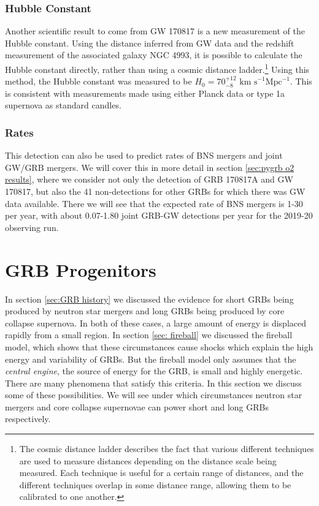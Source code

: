 \documentclass[11pt]{cuthesis}
\begin{document}
\subsubsection{Hubble Constant}
Another scientific result to come from GW 170817 is a new measurement of the Hubble constant. Using the distance inferred from GW data and the redshift measurement of the associated galaxy NGC 4993, it is possible to calculate the Hubble constant directly, rather than using a cosmic distance ladder.\footnote{The cosmic distance ladder describes the fact that various different techniques are used to measure distances depending on the distance scale being measured. Each technique is useful for a certain range of distances, and the different techniques overlap in some distance range, allowing them to be calibrated to one another.} Using this method, the Hubble constant was measured to be $H_0 = 70^{+12}_{-8} \text{ km s}^{-1} \text{Mpc}^{-1}$. This is consistent with measurements made using either Planck data or type 1a supernova as standard candles.\cite{hubble_constant}

\subsubsection{Rates}
This detection can also be used to predict rates of BNS mergers and joint GW/GRB mergers. We will cover this in more detail in section \ref{sec:pygrb o2 results}, where we consider not only the detection of GRB 170817A and GW 170817, but also the 41 non-detections for other GRBs for which there was GW data available. There we will see that the expected rate of BNS mergers is 1-30 per year, with about 0.07-1.80 joint GRB-GW detections per year for the 2019-20 observing run.


\section{GRB Progenitors} \label{sec: grb prog}
In section \ref{sec:GRB history} we discussed the evidence for short GRBs being produced by neutron star mergers and long GRBs being produced by core collapse supernova. In both of these cases, a large amount of energy is displaced rapidly from a small region. In section \ref{sec: fireball} we discussed  the fireball model, which shows that these circumstances cause shocks which explain the high energy and variability of GRBs. But the fireball model only assumes that the \textit{central engine}, the source of energy for the GRB, is small and highly energetic. There are many phenomena that satisfy this criteria. In this section we discuss some of these possibilities. We will see under which circumstances neutron star mergers and core collapse supernovae can power short and long GRBs respectively.
\end{document}
